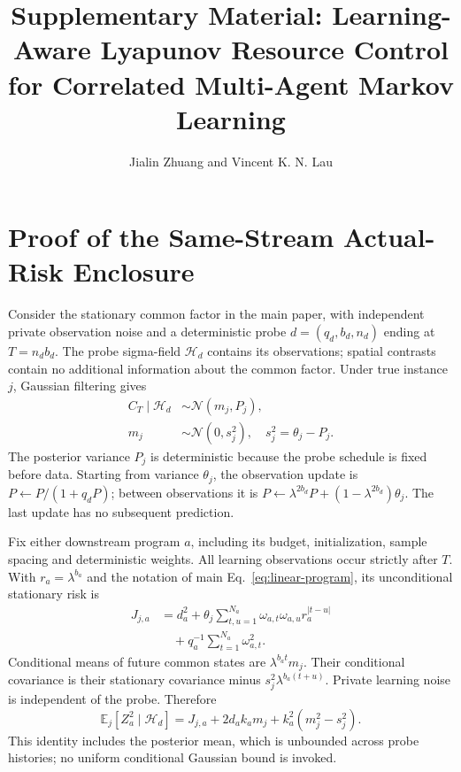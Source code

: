 \documentclass[journal]{IEEEtran}
\title{Supplementary Material: Learning-Aware Lyapunov Resource Control for Correlated Multi-Agent Markov Learning}
\author{Jialin Zhuang and Vincent K. N. Lau}
\newcommand{\E}{\mathbb E}
\begin{document}
\maketitle
\renewcommand{\theequation}{S\arabic{equation}}

\section{Proof of the Same-Stream Actual-Risk Enclosure}
Consider the stationary common factor in the main paper, with independent private observation noise and a deterministic probe $d=(q_d,b_d,n_d)$ ending at $T=n_db_d$.
The probe sigma-field $\mathcal H_d$ contains its observations; spatial contrasts contain no additional information about the common factor.
Under true instance $j$, Gaussian filtering gives
\begin{align}
C_T\mid\mathcal H_d&\sim\mathcal N(m_j,P_j),\nonumber\\
m_j&\sim\mathcal N(0,s_j^2),\quad s_j^2=\theta_j-P_j.
\end{align}
The posterior variance $P_j$ is deterministic because the probe schedule is fixed before data.
Starting from variance $\theta_j$, the observation update is $P\leftarrow P/(1+q_dP)$; between observations it is $P\leftarrow\lambda^{2b_d}P+(1-\lambda^{2b_d})\theta_j$.
The last update has no subsequent prediction.

Fix either downstream program $a$, including its budget, initialization, sample spacing and deterministic weights.
All learning observations occur strictly after $T$.
With $r_a=\lambda^{b_a}$ and the notation of main Eq.~\eqref{eq:linear-program}, its unconditional stationary risk is
\begin{align}
J_{j,a}
&=d_a^2+\theta_j\sum_{t,u=1}^{N_a}\omega_{a,t}\omega_{a,u}r_a^{|t-u|}\nonumber\\
&\quad+q_a^{-1}\sum_{t=1}^{N_a}\omega_{a,t}^2.
\label{eq:supp-exact-risk}
\end{align}
Conditional means of future common states are $\lambda^{b_at}m_j$.
Their conditional covariance is their stationary covariance minus $s_j^2\lambda^{b_a(t+u)}$.
Private learning noise is independent of the probe.
Therefore
\begin{equation}
\E_j[Z_a^2\mid\mathcal H_d]
=J_{j,a}+2d_ak_am_j+k_a^2(m_j^2-s_j^2).
\label{eq:supp-conditional-risk}
\end{equation}
This identity includes the posterior mean, which is unbounded across probe histories; no uniform conditional Gaussian bound is invoked.
\end{document}
